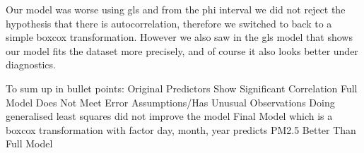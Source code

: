 \documentclass[
]{article}
\begin{document}
Our model was worse using gls and from the phi interval we did not
reject the hypothesis that there is autocorrelation, therefore we
switched to back to a simple boxcox transformation. However we also saw
in the gls model that shows our model fits the dataset more precisely,
and of course it also looks better under diagnostics.

To sum up in bullet points: Original Predictors Show Significant
Correlation Full Model Does Not Meet Error Assumptions/Has Unusual
Observations Doing generalised least squares did not improve the model
Final Model which is a boxcox transformation with factor day, month,
year predicts PM2.5 Better Than Full Model
\end{document}
